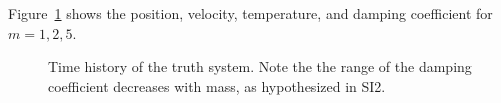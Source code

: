 \documentclass[11pt]{article}
\begin{document}
Figure~\ref{fig:truth} shows the position, velocity, temperature, and
damping coefficient for $m=1,2,5$.
%
\begin{figure}[ht]
\begin{center}
\end{center}
\caption{Time history of the truth system.  Note the the range of the
  damping coefficient decreases with mass, as hypothesized in SI2.}
\label{fig:truth}
\end{figure}
%
\end{document}
